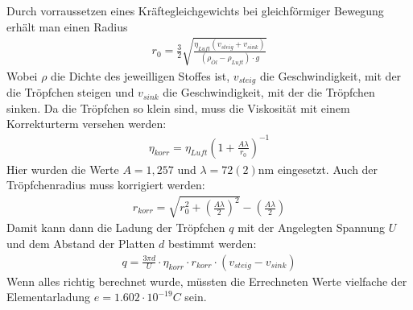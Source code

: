 \documentclass[11pt, a4paper]{article}
\begin{document}
    Durch vorraussetzen eines Kräftegleichgewichts bei gleichförmiger Bewegung erhält man einen Radius
    \begin{align}
        r_0 = \frac{3}{2} \sqrt{\frac{\eta_{Luft} (v_{steig} + v_{sink})}{(\rho_{\ddot{Ol}} - \rho_{Luft}) \cdot g}}%
    \end{align}
    Wobei $\rho$ die Dichte des jeweilligen Stoffes ist, $v_{steig}$ die Geschwindigkeit, mit der die Tröpfchen steigen und $v_{sink}$ die Geschwindigkeit, mit der die Tröpfchen sinken. Da die Tröpfchen so klein sind, muss die Viskosität mit einem Korrekturterm versehen werden:
    \begin{align}
        \eta_{korr} = \eta_{Luft}\left(1+\frac{A \lambda}{r_0}\right)^{-1}
    \end{align}
    Hier wurden die Werte $A = 1,257$ und $\lambda = 72(2) \si{\nano\metre}$ eingesetzt.
    Auch der Tröpfchenradius muss korrigiert werden:
    \begin{align}
        r_{korr} = \sqrt{r_0^2 + \left(\frac{A \lambda}{2}\right)^2} - \left(\frac{A \lambda}{2}\right)
    \end{align}
    Damit kann dann die Ladung der Tröpfchen $q$ mit der Angelegten Spannung $U$ und dem Abstand der Platten $d$ bestimmt werden:
    \begin{align}
        q = \frac{3 \pi d}{U} \cdot \eta_{korr} \cdot r_{korr} \cdot \left(v_{steig} - v_{sink}\right)
    \end{align}
    Wenn alles richtig berechnet wurde, müssten die Errechneten Werte vielfache der Elementarladung $e = 1.602 \cdot 10^{-19} \si{C}$ sein.
\end{document}
